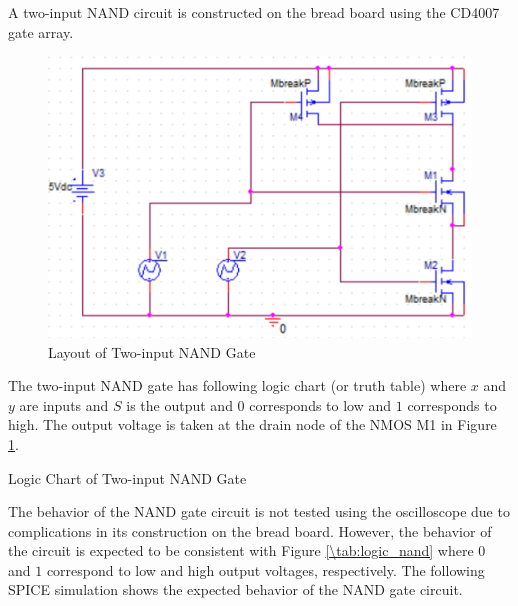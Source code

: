 
A two-input NAND circuit is constructed on the bread board using the CD4007 gate array.

\FloatBarrier

\begin{figure}[h!]
	\centering
	\includegraphics[scale=0.50]{../images/nand_schematic.PNG}
	\caption{Layout of Two-input NAND Gate}
	\label{fig:nand_schematic}
\end{figure}

\FloatBarrier

The two-input NAND gate has following logic chart (or truth table) where $x$ and $y$ are inputs and $S$ is the output and $0$ corresponds to low and $1$ corresponds to high.
The output voltage is taken at the drain node of the NMOS M1 in Figure \ref{fig:nand_schematic}.

\FloatBarrier

\begin{table}[h!]
	\centering
	\caption{Logic Chart of Two-input NAND Gate}
	\label{tab:logic_nand}
\end{table}

\FloatBarrier

The behavior of the NAND gate circuit is not tested using the oscilloscope due to complications in its construction on the bread board.
However, the behavior of the circuit is expected to be consistent with Figure \ref{\tab:logic_nand} where $0$ and $1$ correspond to low and high output voltages, respectively.
The following SPICE simulation shows the expected behavior of the NAND gate circuit.

\FloatBarrier

